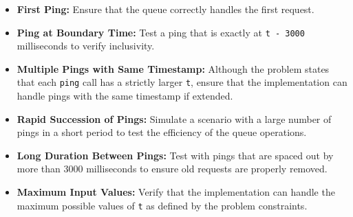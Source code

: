 \begin{itemize}
    \item \textbf{First Ping:} Ensure that the queue correctly handles the first request.
    
    \item \textbf{Ping at Boundary Time:} Test a ping that is exactly at \texttt{t - 3000} milliseconds to verify inclusivity.
    
    \item \textbf{Multiple Pings with Same Timestamp:} Although the problem states that each \texttt{ping} call has a strictly larger \texttt{t}, ensure that the implementation can handle pings with the same timestamp if extended.
    
    \item \textbf{Rapid Succession of Pings:} Simulate a scenario with a large number of pings in a short period to test the efficiency of the queue operations.
    
    \item \textbf{Long Duration Between Pings:} Test with pings that are spaced out by more than 3000 milliseconds to ensure old requests are properly removed.
    
    \item \textbf{Maximum Input Values:} Verify that the implementation can handle the maximum possible values of \texttt{t} as defined by the problem constraints.
\end{itemize}

\printindex